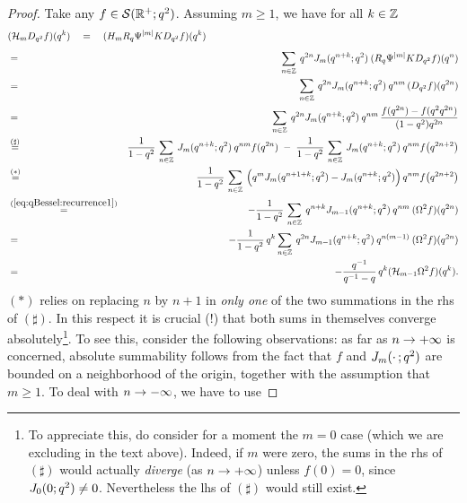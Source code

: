\begin{proof}
Take any $f\in {\mathcal S}(\mathbb{R}^+;q^2)$. Assuming $m \geq 1$, we have for all $k\in \mathbb{Z}$
\begin{eqnarray*}
\lefteqn{(\auxH{m} D_{q^2} f)(q^k)
  \hspace{1em} = \hspace{1em}
      (H_m R_q \Psi^{|m|} K D_{q^2} f)(q^k)} \\
  \vertXL
  &=& \sum_{n\in \ZZ} \: q^{2n} \J{m}{q^{n+k}}\: (R_q \Psi^{|m|} K D_{q^2} f)(q^n)\\
  &=& \sum_{n\in \ZZ} \: q^{2n} \J{m}{q^{n+k}}\: q^{nm}\,(D_{q^2} f)(q^{2n}) \\
  &=& \sum_{n\in \ZZ} \: q^{2n} \J{m}{q^{n+k}}\: q^{nm}\,
      \frac{f(q^{2n})-f(q^2 q^{2n})}{(1-q^2) q^{2n}} \\
  &\stackrel{(\sharp)}{=}&
   \frac{1}{1-q^2}\,  \sum_{n\in \ZZ} \: \J{m}{q^{n+k}}\: q^{nm} f(q^{2n})
  \;-\;\frac{1}{1-q^2}\, \sum_{n\in \ZZ} \: \J{m}{q^{n+k}}\:
              q^{nm} f\!\left(q^{2n+2}\right) \\
  &\stackrel{(*)}{=}&
      \frac{1}{1-q^2}\, \sum_{n\in \ZZ} \:
           \left(q^m \J{m}{q^{n+1+k}} - \J{m}{q^{n+k}}\vertL\right)
            q^{nm} f\!\left(q^{2n+2}\right)\\
  &\stackrel{(\ref{eq:qBessel:recurrence1})}{=}&
       -\frac{1}{1-q^2}\, \sum_{n\in \ZZ} \:
         q^{n+k} \J{m-1}{q^{n+k}}\: q^{nm} \:(\Omega^2 f)(q^{2n}) \\
  &=& -\frac{1}{1-q^2}\, q^k \sum_{n\in \ZZ} \:
         q^{2n} \J{m-1}{q^{n+k}} \: q^{n(m-1)}\: (\Omega^2 f)(q^{2n}) \\
  &=& -\frac{q^{-1}}{q^{-1}-q}\, q^k (\auxH{m-1} \Omega^2 f)(q^k).
\end{eqnarray*}
$(*)$ relies on replacing $n$ by $n+1$ in {\em only one\/} of the two summations
in the {\sc rhs} of $(\sharp)$. In this respect it is
crucial (!) that both sums in themselves converge
absolutely\footnote{To appreciate this, do consider for a moment the
$m=0$ case (which we are excluding in the text above). Indeed, if $m$ were zero, the
sums in the {\sc rhs} of $(\sharp)$ would actually {\em diverge\/}
(as $n \rightarrow +\infty$) unless $f(0)=0$, since $J_{0}(0; q^2)\neq 0$.
Nevertheless the {\sc lhs} of $(\sharp)$ would still exist.}. To see this,
consider the following observations: as far as $n \rightarrow +\infty$ is concerned,
absolute summability follows from the fact that $f$ and $J_{m}(\cdot\,; q^2)$
are bounded on a neighborhood of the origin, together with the
assumption that $m\geq 1$. To deal with $n \rightarrow -\infty$, we have to use

\end{proof}
